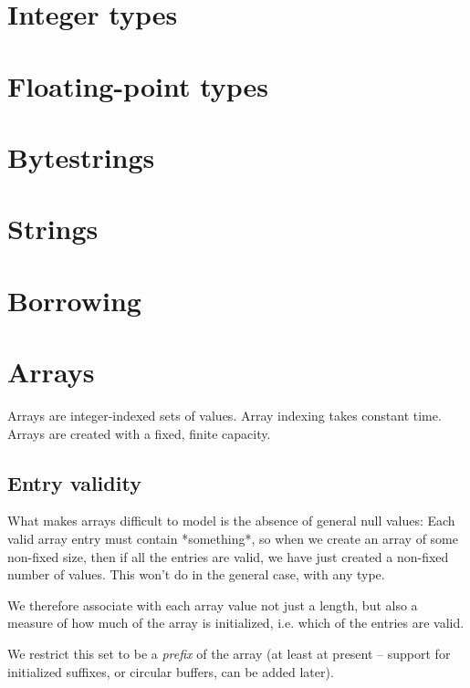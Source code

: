 \documentclass[a4paper]{book}
\begin{document}
\chapter{Integer types}
\chapter{Floating-point types}
\chapter{Bytestrings}
\chapter{Strings}
\chapter{Borrowing}


\chapter{Arrays}

Arrays are integer-indexed sets of values.
Array indexing takes constant time.
Arrays are created with a fixed, finite capacity.

\section{Entry validity}

What makes arrays difficult to model is the absence of general null values:
Each valid array entry must contain *something*, so when we create an
array of some non-fixed size, then if all the entries are valid, we
have just created a non-fixed number of values.
This won't do in the general case, with any type.

We therefore associate with each array value not just a length, but
also a measure of how much of the array is initialized, i.e. which of
the entries are valid.

We restrict this set to be a \emph{prefix} of the array (at least at
present -- support for initialized suffixes, or circular buffers, can
be added later).
\end{document}
